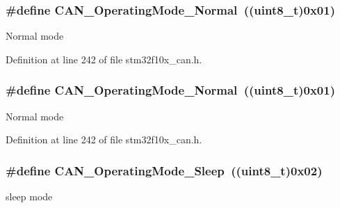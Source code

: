 \subsubsection[{\texorpdfstring{C\+A\+N\+\_\+\+Operating\+Mode\+\_\+\+Normal}{CAN_OperatingMode_Normal}}]{\setlength{\rightskip}{0pt plus 5cm}\#define C\+A\+N\+\_\+\+Operating\+Mode\+\_\+\+Normal~(({\bf uint8\+\_\+t})0x01)}\hypertarget{group___c_a_n___operating___mode_ga663ecffaa60d1a201a035dfa45325848}{}\label{group___c_a_n___operating___mode_ga663ecffaa60d1a201a035dfa45325848}
Normal mode 

Definition at line 242 of file stm32f10x\+\_\+can.\+h.

\subsubsection[{\texorpdfstring{C\+A\+N\+\_\+\+Operating\+Mode\+\_\+\+Normal}{CAN_OperatingMode_Normal}}]{\setlength{\rightskip}{0pt plus 5cm}\#define C\+A\+N\+\_\+\+Operating\+Mode\+\_\+\+Normal~(({\bf uint8\+\_\+t})0x01)}\hypertarget{group___c_a_n___operating___mode_ga663ecffaa60d1a201a035dfa45325848}{}\label{group___c_a_n___operating___mode_ga663ecffaa60d1a201a035dfa45325848}
Normal mode 

Definition at line 242 of file stm32f10x\+\_\+can.\+h.

\subsubsection[{\texorpdfstring{C\+A\+N\+\_\+\+Operating\+Mode\+\_\+\+Sleep}{CAN_OperatingMode_Sleep}}]{\setlength{\rightskip}{0pt plus 5cm}\#define C\+A\+N\+\_\+\+Operating\+Mode\+\_\+\+Sleep~(({\bf uint8\+\_\+t})0x02)}\hypertarget{group___c_a_n___operating___mode_ga173b85d2baaa6249d966b8073e3ad8ca}{}\label{group___c_a_n___operating___mode_ga173b85d2baaa6249d966b8073e3ad8ca}
sleep mode 

